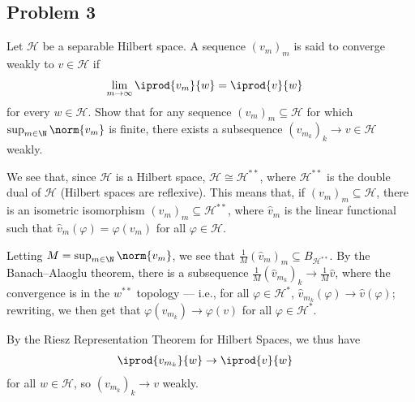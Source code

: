 \documentclass[10pt]{mypackage}
\begin{document}
\subsection{Problem 3}%
\begin{problem}
  Let $\mathcal{H}$ be a separable Hilbert space. A sequence $\left( v_m \right)_m$ is said to converge weakly to $v\in \mathcal{H}$ if
  \begin{align*}
    \lim_{m\rightarrow\infty} \iprod{v_m}{w} &= \iprod{v}{w}
  \end{align*}
  for every $w\in \mathcal{H}$. Show that for any sequence $\left( v_m \right)_m\subseteq \mathcal{H}$ for which $\sup_{m\in\N} \norm{v_m}$ is finite, there exists a subsequence $\left( v_{m_{k}} \right)_k\rightarrow v\in \mathcal{H}$ weakly.
\end{problem}
We see that, since $\mathcal{H}$ is a Hilbert space, $\mathcal{H}\cong \mathcal{H}^{\ast\ast}$, where $\mathcal{H}^{\ast\ast}$ is the double dual of $\mathcal{H}$ (Hilbert spaces are reflexive). This means that, if $\left( v_m \right)_m\subseteq \mathcal{H}$, there is an isometric isomorphism $\left( \hat{v}_m \right)_m\subseteq \mathcal{H}^{\ast\ast}$, where $\hat{v}_m$ is the linear functional such that $\hat{v}_m(\varphi) = \varphi\left( v_m \right)$ for all $\varphi\in \mathcal{H}$.\newline

Letting $M = \sup_{m\in \N} \norm{v_m}$, we see that $\frac{1}{M} \left( \hat{v}_m \right)_m\subseteq B_{\mathcal{H}^{\ast\ast}}$. By the Banach--Alaoglu theorem, there is a subsequence $\frac{1}{M}\left( \hat{v}_{m_k} \right)_k\rightarrow \frac{1}{M}\hat{v}$, where the convergence is in the $w^{\ast\ast}$ topology --- i.e., for all $\varphi\in \mathcal{H}^{\ast}$, $\hat{v}_{m_{k}}\left( \varphi \right)\rightarrow \hat{v}\left( \varphi \right)$; rewriting, we then get that $\varphi\left( v_{m_{k}} \right) \rightarrow \varphi\left( v \right)$ for all $\varphi\in \mathcal{H}^{\ast}$.\newline

By the Riesz Representation Theorem for Hilbert Spaces, we thus have
\begin{align*}
  \iprod{v_{m_{k}}}{w} &\rightarrow \iprod{v}{w}
\end{align*}
for all $w\in \mathcal{H}$, so $\left( v_{m_{k}} \right)_k\rightarrow v$ weakly.
\end{document}
